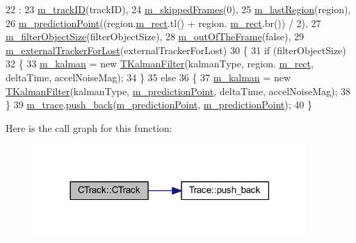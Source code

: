 \begin{DoxyCode}
22     :
23       \mbox{\hyperlink{class_c_track_a8aae01d68f5a1a6c0292476ea19c89f9}{m\_trackID}}(trackID),
24       \mbox{\hyperlink{class_c_track_a3308a34b70a90692b0fb863eb621bd37}{m\_skippedFrames}}(0),
25       \mbox{\hyperlink{class_c_track_a5af91fbfad7ebf07bd0f681f915e440c}{m\_lastRegion}}(region),
26       \mbox{\hyperlink{class_c_track_a8ee3f8baaf290aeb113f34c26a446a76}{m\_predictionPoint}}((region.\mbox{\hyperlink{class_c_region_a6f68304e90428db829cc38792fa3e1e8}{m\_rect}}.tl() + region.
      \mbox{\hyperlink{class_c_region_a6f68304e90428db829cc38792fa3e1e8}{m\_rect}}.br()) / 2),
27       \mbox{\hyperlink{class_c_track_a5573dab5b9fe2e5143204355b8146c87}{m\_filterObjectSize}}(filterObjectSize),
28       \mbox{\hyperlink{class_c_track_ad97c3e53969dbb60e7690c4f2d038172}{m\_outOfTheFrame}}(\textcolor{keyword}{false}),
29       \mbox{\hyperlink{class_c_track_a7d1f6c9d8d56790a28a7139e85896dc8}{m\_externalTrackerForLost}}(externalTrackerForLost)
30 \{
31     \textcolor{keywordflow}{if} (filterObjectSize)
32     \{
33         \mbox{\hyperlink{class_c_track_a8d676e67fb1b5cae95cc7db3cdc24f5f}{m\_kalman}} = \textcolor{keyword}{new} \mbox{\hyperlink{class_t_kalman_filter}{TKalmanFilter}}(kalmanType, region.
      \mbox{\hyperlink{class_c_region_a6f68304e90428db829cc38792fa3e1e8}{m\_rect}}, deltaTime, accelNoiseMag);
34     \}
35     \textcolor{keywordflow}{else}
36     \{
37         \mbox{\hyperlink{class_c_track_a8d676e67fb1b5cae95cc7db3cdc24f5f}{m\_kalman}} = \textcolor{keyword}{new} \mbox{\hyperlink{class_t_kalman_filter}{TKalmanFilter}}(kalmanType, 
      \mbox{\hyperlink{class_c_track_a8ee3f8baaf290aeb113f34c26a446a76}{m\_predictionPoint}}, deltaTime, accelNoiseMag);
38     \}
39     \mbox{\hyperlink{class_c_track_adf88ff8678ec928ac3ca764f7308b96f}{m\_trace}}.\mbox{\hyperlink{class_trace_a5bca62bb3439cd12991f848a875d4085}{push\_back}}(\mbox{\hyperlink{class_c_track_a8ee3f8baaf290aeb113f34c26a446a76}{m\_predictionPoint}}, 
      \mbox{\hyperlink{class_c_track_a8ee3f8baaf290aeb113f34c26a446a76}{m\_predictionPoint}});
40 \}
\end{DoxyCode}
Here is the call graph for this function\+:\nopagebreak
\begin{figure}[H]
\begin{center}
\leavevmode
\includegraphics[width=294pt]{class_c_track_a4c79152aa6d38a03c6fa80b2b3510808_cgraph}
\end{center}
\end{figure}


